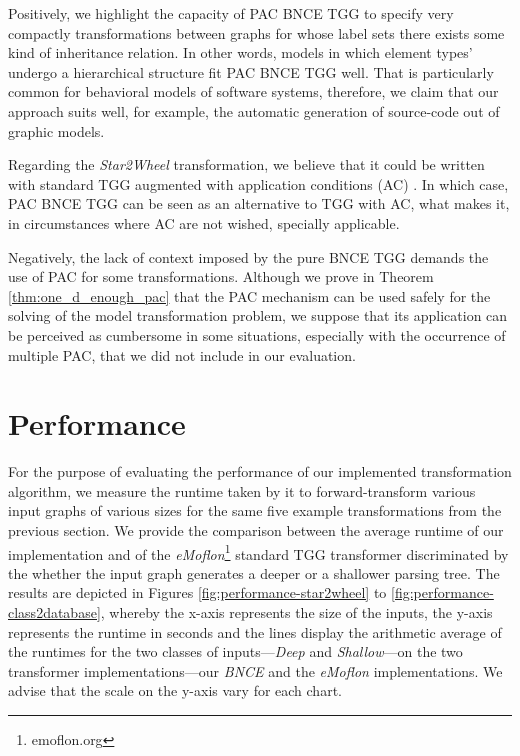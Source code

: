 Positively, we highlight the capacity of PAC BNCE TGG to specify very compactly transformations between graphs for whose label sets there exists some kind of inheritance relation. In other words, models in which element types' undergo a hierarchical structure fit PAC BNCE TGG well. That is particularly common for behavioral models of software systems, therefore, we claim that our approach suits well, for example, the automatic generation of source-code out of graphic models.

Regarding the \emph{Star2Wheel} transformation, we believe that it could be written with standard TGG augmented with application conditions (AC) \cite{ehrig2009completeness}. In which case, PAC BNCE TGG can be seen as an alternative to TGG with AC, what makes it, in circumstances where AC are not wished, specially applicable.

Negatively, the lack of context imposed by the pure BNCE TGG demands the use of PAC for some transformations. Although we prove in Theorem \ref{thm:one_d_enough_pac} that the PAC mechanism can be used safely for the solving of the model transformation problem, we suppose that its application can be perceived as cumbersome in some situations, especially with the occurrence of multiple PAC, that we did not include in our evaluation.

\section{Performance}
\label{sec:eval-performance}
For the purpose of evaluating the performance of our implemented transformation algorithm, we measure the runtime taken by it to forward-transform various input graphs of various sizes for the same five example transformations from the previous section. We provide the comparison between the average runtime of our implementation and of the \emph{eMoflon}\footnote{emoflon.org} standard TGG transformer \cite{leblebici2014developing} discriminated by the whether the input graph generates a deeper or a shallower parsing tree. The results are depicted in Figures \ref{fig:performance-star2wheel} to \ref{fig:performance-class2database}, whereby the x-axis represents the size of the inputs, the y-axis represents the runtime in seconds and the lines display the arithmetic average of the runtimes for the two classes of inputs---\emph{Deep} and \emph{Shallow}---on the two transformer implementations---our \emph{BNCE} and the \emph{eMoflon} implementations. We advise that the scale on the y-axis vary for each chart.

